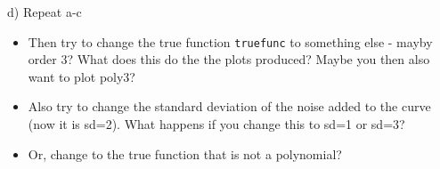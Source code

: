 \documentclass[ignorenonframetext,]{beamer}
\providecommand{\tightlist}{%
  \setlength{\itemsep}{0pt}\setlength{\parskip}{0pt}}
\begin{document}
\begin{frame}[fragile]

\begin{block}{d) Repeat a-c}

\begin{itemize}
\tightlist
\item
  Then try to change the true function \texttt{truefunc} to something
  else - mayby order 3? What does this do the the plots produced? Maybe
  you then also want to plot poly3?
\item
  Also try to change the standard deviation of the noise added to the
  curve (now it is sd=2). What happens if you change this to sd=1 or
  sd=3?
\item
  Or, change to the true function that is not a polynomial?
\end{itemize}

\end{block}

\end{frame}
\end{document}
